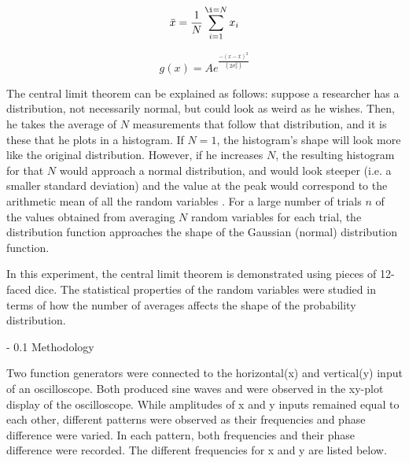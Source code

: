 \documentclass[twoside]{article}
\makeatletter
\renewcommand\section{\@startsection
   {section}{1}{0pt}%
   {-\baselineskip}%
   {0.1\baselineskip}%
   {\normalfont\large\bfseries}}%
\makeatother
\begin{document}
\begin{equation}
\bar{x} = \frac{1}{N}\sum_{i=1}^{\i=N}x_i
\label{mean}
\end{equation}

\begin{equation}
g(x)=Ae^{\frac{-(x-\bar{x})^2}{(2\sigma_x^2)}}
\label{Gaussian}
\end{equation}

The central limit theorem can be explained as follows: suppose a researcher has a distribution, not necessarily normal, but could look as weird as he wishes. Then, he takes the average of $N$ measurements that follow that distribution, and it is these that he plots in a histogram. If $N = 1$, the histogram’s shape will look more like the original distribution. However, if he increases $N$, the resulting histogram for that $N$ would approach a normal distribution, and would look steeper (i.e. a smaller standard deviation) and the value at the peak would correspond to the arithmetic mean of all the random variables \cite{khan}. For a large number of trials $n$ of the values obtained from averaging $N$ random variables for each trial, the distribution function approaches the shape of the Gaussian (normal) distribution function.

In this experiment, the central limit theorem is demonstrated using pieces of 12-faced dice. The statistical properties of the random variables were studied in terms of how the number of averages affects the shape of the probability distribution.

\section{Methodology}
\label{sec:metho}

Two function generators were connected to the horizontal(x) and vertical(y) input of an oscilloscope. Both produced sine waves and were observed in the xy-plot display of the oscilloscope. While amplitudes of x and y inputs remained equal to each other, different patterns were observed as their frequencies and phase difference were varied. In each pattern, both frequencies and their phase difference were recorded. The different frequencies for x and y are listed below. 
\end{document}
